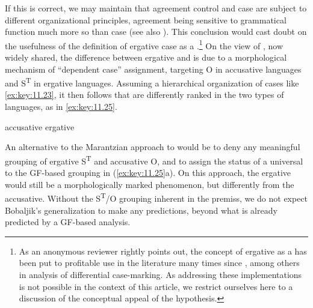 \documentclass[output=paper]{langsci/langscibook}
\begin{document}
If this is correct, we may maintain that agreement control and case are subject
to different organizational principles, agreement being sensitive to
grammatical function much more so than case (see also \citealt{Legate2008}).
This conclusion would cast doubt on the usefulness of the definition of
ergative case as a  \citep{Marantz1991}.\footnote{As an anonymous
    reviewer rightly points out, the concept of ergative as a 
    has been put to profitable use in the literature many times since
    \citet{Marantz1991}, among others in  analysis of
    differential case-marking. As addressing these implementations is not
    possible in the context of this article, we restrict ourselves here to a
    discussion of the conceptual appeal of the  hypothesis.} On
    the view of \citet{Marantz1991}, now widely shared, the difference between
    ergative and   is due to a morphological
    mechanism of \enquote{dependent case} assignment, targeting O in accusative
    languages and S\textsuperscript{T} in ergative languages. Assuming a
    hierarchical organization of cases like \eqref{ex:key:11.23}, it then
    follows that  are differently ranked in the two types
    of languages, as in \eqref{ex:key:11.25}.

\ea%
    \label{ex:key:11.25}
    \ea accusative 
	\ex ergative 
	\z
\z

An alternative to the Marantzian approach to  would be to deny
any meaningful grouping of ergative S\textsuperscript{T} and accusative O, and
to assign the status of a universal to the \gls{GF}-based grouping in
(\ref{ex:key:11.25}a). On this approach, the ergative would still be a
morphologically marked phenomenon, but differently from the accusative. Without
the S\textsuperscript{T}/O grouping inherent in the  premiss, we
do not expect Bobaljik’s generalization to make any predictions, beyond what is
already predicted by a \gls{GF}-based analysis.\largerpage[1]
\end{document}
